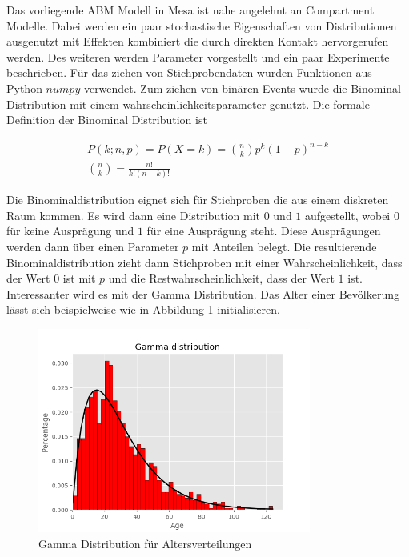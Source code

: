 \documentclass[paper=a4, fontsize=11pt, ngerman, abstract=on]{scrartcl}
\numberwithin{equation}{section} %
\numberwithin{figure}{section} %
\numberwithin{table}{section} %
\begin{document}
Das vorliegende ABM Modell in Mesa ist nahe angelehnt an Compartment Modelle. Dabei werden ein paar stochastische Eigenschaften von Distributionen ausgenutzt mit Effekten kombiniert die durch direkten Kontakt hervorgerufen werden. Des weiteren werden Parameter vorgestellt und ein paar Experimente beschrieben. Für das ziehen von Stichprobendaten wurden Funktionen aus Python $numpy$ verwendet. Zum ziehen von binären Events wurde die Binominal Distribution mit einem wahrscheinlichkeitsparameter genutzt. Die formale Definition der Binominal Distribution ist

\begin{gather*}
  P(k; n, p) = P(X = k) = \binom{n}{k}p^{k}(1 - p)^{n - k} \\
  \binom{n}{k} = \frac{n!}{k!(n-k)!}
\end{gather*}

Die Binominaldistribution eignet sich für Stichproben die aus einem diskreten Raum kommen. Es wird dann eine Distribution mit $0$ und $1$ aufgestellt, wobei $0$ für keine Ausprägung und $1$ für eine Ausprägung steht. Diese Ausprägungen werden dann über einen Parameter $p$ mit Anteilen belegt. Die resultierende Binominaldistribution zieht dann Stichproben mit einer Wahrscheinlichkeit, dass der Wert $0$ ist mit $p$ und die Restwahrscheinlichkeit, dass der Wert $1$ ist. Interessanter wird es mit der Gamma Distribution. Das Alter einer Bevölkerung lässt sich beispielweise wie in Abbildung \ref{fig:gamma-age-dist} initialisieren.

\begin{figure}[ht]
  \centering
  \includegraphics[width=0.8\textwidth,keepaspectratio]{images/gamma-age-dist}
  \caption{Gamma Distribution für Altersverteilungen}
  \label{fig:gamma-age-dist}
\end{figure}
\end{document}

